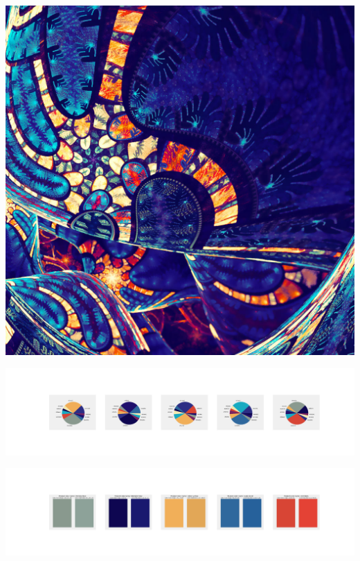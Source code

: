 \documentclass[11pt]{article}
\begin{document}
\begin{landscape}
    \begin{center}
    \includegraphics[width=\textwidth]{./nbimg/file (414).jpg}
    \end{center}

    \begin{center}
    \includegraphics[width=250mm]{./nbimg/pie-350.jpg}
    \end{center}

    \begin{center}
    \includegraphics[width=250mm]{./nbimg/peak-350.jpg}
    \end{center}
    


\end{landscape}
\end{document}
